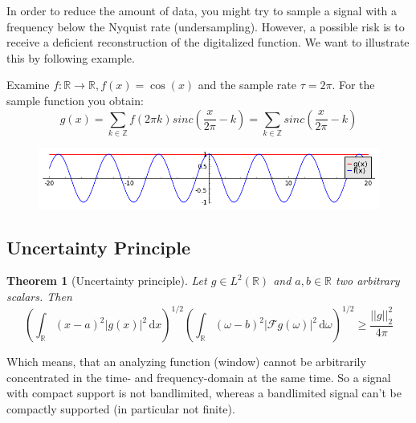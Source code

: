 \documentclass[a4paper, 11pt]{scrreprt}
\newtheorem{theorem}[defi]{Theorem}
\newcommand{\RR}{\mathbb{R}}
\newcommand{\ZZ}{\mathbb{Z}}
\newcommand{\FF}{\mathcal{F}}
\newcommand{\student}[1]{\marginnote{{\normalfont\bf #1}}}
\begin{document}
\student{Andreas}
In order to reduce the amount of data, you might try to sample a signal with a frequency below the Nyquist rate (undersampling). However, a possible risk is to receive a deficient reconstruction of the digitalized function. We want to illustrate this by following example.

Examine $f:\RR \rightarrow \RR, f(x) = \cos(x)$ and the sample rate $\tau = 2 \pi$. For the sample function you obtain:
\[g(x) = \sum_{k \in \ZZ} f(2\pi k) sinc(\frac{x}{2 \pi}- k) = \sum_{k \in \ZZ} sinc(\frac{x}{2 \pi}- k)\]

\begin{figure}[htpb]
\centering
	\includegraphics[height=0.2\textwidth]{SampleFunction.png}
\end{figure}


\subsection{Uncertainty Principle}
\student{Manuela}
\label{se:uncertainty}
\begin{theorem}[Uncertainty principle]
Let \(g\in L^2(\RR) \) and \(a,b \in\RR\) two arbitrary scalars. Then
\begin{equation}
\label{eq:uncertainty}
\left(\int_{\RR} (x-a)^2|g(x)|^2 \,\mathrm{d}x\right)^{1/2}\left(\int_{\RR}(\omega-b)^2|\FF g(\omega)|^2\,\mathrm{d}\omega\right)^{1/2} \geq \frac{||g||_2^2}{4\pi}
\end{equation}
\end{theorem}
Which means, that an analyzing function (window) cannot be arbitrarily concentrated in the time- and frequency-domain at the same time. So a signal with compact support is not bandlimited, whereas a bandlimited signal can't be compactly supported (in particular not finite).\\
\end{document}
